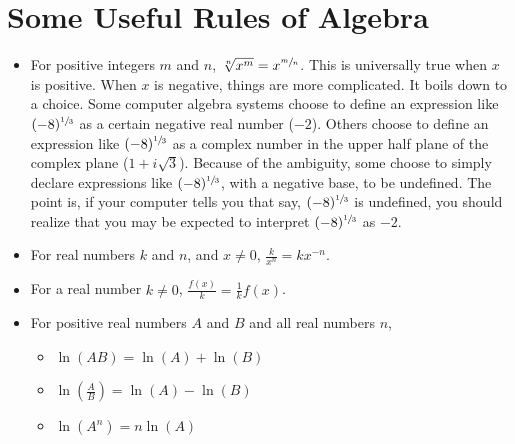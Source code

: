 \documentclass[12pt,]{book}
\theoremstyle{plain}
\theoremstyle{definition}
\theoremstyle{definition}
\theoremstyle{definition}
\theoremstyle{definition}
\theoremstyle{definition}
\numberwithin{equation}{section}
\newcommand{\fe}[2]{#1\mathopen{}\left(#2\right)\mathclose{}}
\begin{document}
\chapter[{Some Useful Rules of Algebra}]{Some Useful Rules of Algebra}\label{appendix-useful-algebra}
\leavevmode%
\begin{itemize}[label=\textbullet]
\item{}For positive integers \(m\) and \(n\), \(\sqrt[n]{x^m}=x^{\sfrac{m}{n}}\). This is universally true when \(x\) is positive. When \(x\) is negative, things are more complicated. It boils down to a choice. Some computer algebra systems choose to define an expression like \((-8)^{\sfrac{1}{3}}\) as a certain negative real number (\(-2\)). Others choose to define an expression like \((-8)^{\sfrac{1}{3}}\) as a complex number in the upper half plane of the complex plane (\(1+i\sqrt{3}\)). Because of the ambiguity, some choose to simply declare expressions like \((-8)^{\sfrac{1}{3}}\), with a negative base, to be undefined. The point is, if your computer tells you that say, \((-8)^{\sfrac{1}{3}}\) is undefined, you should realize that you may be expected to interpret \((-8)^{\sfrac{1}{3}}\) as \(-2\).%
\item{}For real numbers \(k\) and \(n\), and \(x\neq0\), \(\frac{k}{x^n}=kx^{-n}\).%
\item{}For a real number \(k\neq0\), \(\frac{\fe{f}{x}}{k}=\frac{1}{k}\fe{f}{x}\).%
\item{}For positive real numbers \(A\) and \(B\) and all real numbers \(n\),%
%
\begin{itemize}[label=$\circ$]
\item{}\(\fe{\ln}{AB}=\fe{\ln}{A}+\fe{\ln}{B}\)%
\item{}\(\fe{\ln}{\frac{A}{B}}=\fe{\ln}{A}-\fe{\ln}{B}\)%
\item{}\(\fe{\ln}{A^n}=n\fe{\ln}{A}\)%
\end{itemize}
\end{itemize}
\typeout{************************************************}
\typeout{************************************************}
\end{document}
